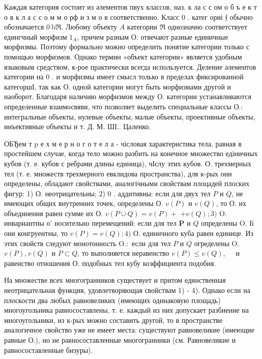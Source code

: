 \documentclass[10pt]{article}
\begin{document}
Каждая категория состоит из әлементов пвух классов, наз. к ла с с ом о б ъ е к т о в к л а с с о м м о рф и з м о в соответственно. Класс 0 . катег ориі $\mathfrak{f}$ обычно обозначается $0 \mathrm{~b} \Re$. Любому объекту $A$ категории $\Re$ однозначно соответствует едингчный морфизм $1_{A}$, причем разным О. отвечают разные единичные морфизмы. Поэтому формально можно определить понятие категории только с помощью морфизмов. Однако термин «объект категории» является удобным языковым средством, к-рое практически всегда используется. Деление әлементов категории на 0 . и морфизмы имеет смысл только в пределах фиксированной категоршІ, так как О. одной категории могут быть морфизмами другой и наоборот. Благодаря наличию морфизмов между О. категории устанавливаются определенные взаимосвяви, что позволяет выделить специальные классы О.: интегральные объекты, нулевые объекты, малые объекты, проективные объекты, инъективные объекты и т. Д. М. ШІ.. Цаленко.



ОБЂем т p е х м е р н о г о т е л а - чісловая характеристика тела, равная в простейшем случае, когда тело можно разбить на конечное множество едіничных кубов (т. е. кубов с ребрами длины единица), чІслу этих кубов. О. трехмерных тел (т. е. множеств трехмерного евклидова пространства), для к-рых они определены, обладают свойствами, аналогічными свойствам плоцадей плоских фигур: 1) О. неотрицательны; 2) 0 . аддитивны: если для двух тел $P$ и $Q$, не имеющих общих внутренних точек, определены О. $v(P)$ и $v(Q)$, то О. их объединения равен сумме их О. $v(P \cup Q)=v(P)+$ $+v(Q) ; 3)$ O. инвариантны о' носительно перемещений: если для тел $\boldsymbol{P}$ и $Q$ определены O. Іі они конгруентны, то $v(P)=v(Q) ; 4)$ О. единичного куба равен единице. Из этих свойств следуют монотонность $\mathrm{O} .:$ если для тел $P$ и $Q$ огределены O. $v(P), v(Q)$ и $P \subset Q$, то выполняется неравенство $v(P) \leqslant v(Q), \quad$ и равенство отношения О. подобных тел кубу коэффициента подобия.



На множестве всех многогранников существует и притом единственная неотрицательная функция, удовлетворяющая свойствам 1) - 4). Однако если на плоскости два любых равновеликих (имеющих одинаковую площадь) многоугольника равносоставлены, т. е. каждый из них допускает разбиение на многоугольники, из к-рых можно составить другой, то в пространстве аналогичное свойство уже не имеет места: существуют равновеликие (имеющие равные О.), но не равносоставленные многогранники (см. Равновеликие и равносоставленные бизуры).
\end{document}
